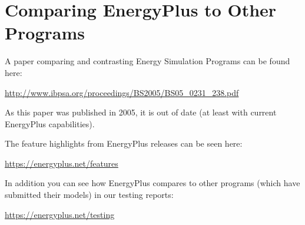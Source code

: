 \section{Comparing EnergyPlus to Other Programs}\label{comparing-energyplus-to-other-programs}

A paper comparing and contrasting Energy Simulation Programs can be found here:

\url{http://www.ibpsa.org/proceedings/BS2005/BS05_0231_238.pdf}

As this paper was published in 2005, it is out of date (at least with current EnergyPlus capabilities).

The feature highlights from EnergyPlus releases can be seen here:

\url{https://energyplus.net/features}

In addition you can see how EnergyPlus compares to other programs (which have submitted their models) in our testing reports:

\url{https://energyplus.net/testing}
